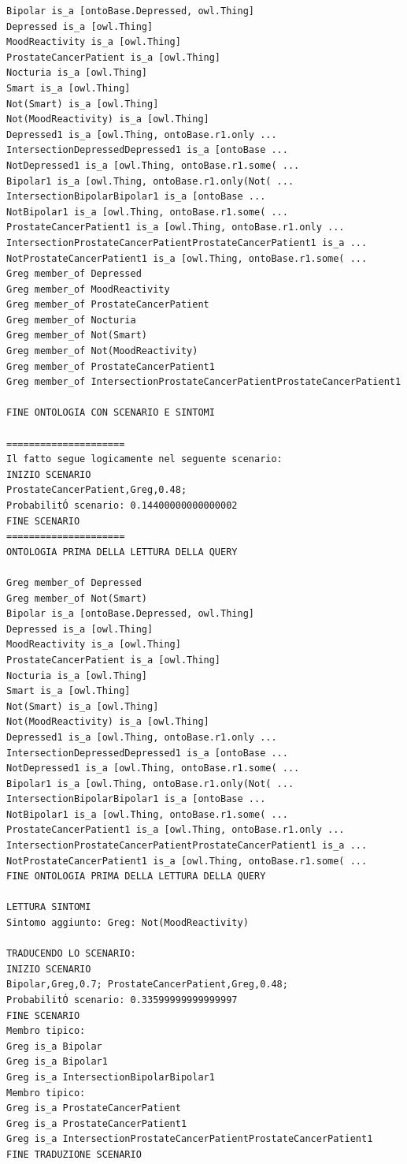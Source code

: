 \begin{verbatim}
Bipolar is_a [ontoBase.Depressed, owl.Thing]
Depressed is_a [owl.Thing]
MoodReactivity is_a [owl.Thing]
ProstateCancerPatient is_a [owl.Thing]
Nocturia is_a [owl.Thing]
Smart is_a [owl.Thing]
Not(Smart) is_a [owl.Thing]
Not(MoodReactivity) is_a [owl.Thing]
Depressed1 is_a [owl.Thing, ontoBase.r1.only ...
IntersectionDepressedDepressed1 is_a [ontoBase ...
NotDepressed1 is_a [owl.Thing, ontoBase.r1.some( ...
Bipolar1 is_a [owl.Thing, ontoBase.r1.only(Not( ...
IntersectionBipolarBipolar1 is_a [ontoBase ...
NotBipolar1 is_a [owl.Thing, ontoBase.r1.some( ...
ProstateCancerPatient1 is_a [owl.Thing, ontoBase.r1.only ...
IntersectionProstateCancerPatientProstateCancerPatient1 is_a ...
NotProstateCancerPatient1 is_a [owl.Thing, ontoBase.r1.some( ...
Greg member_of Depressed
Greg member_of MoodReactivity
Greg member_of ProstateCancerPatient
Greg member_of Nocturia
Greg member_of Not(Smart)
Greg member_of Not(MoodReactivity)
Greg member_of ProstateCancerPatient1
Greg member_of IntersectionProstateCancerPatientProstateCancerPatient1

FINE ONTOLOGIA CON SCENARIO E SINTOMI

=====================
Il fatto segue logicamente nel seguente scenario: 
INIZIO SCENARIO
ProstateCancerPatient,Greg,0.48; 
ProbabilitÓ scenario: 0.14400000000000002
FINE SCENARIO
=====================
ONTOLOGIA PRIMA DELLA LETTURA DELLA QUERY

Greg member_of Depressed
Greg member_of Not(Smart)
Bipolar is_a [ontoBase.Depressed, owl.Thing]
Depressed is_a [owl.Thing]
MoodReactivity is_a [owl.Thing]
ProstateCancerPatient is_a [owl.Thing]
Nocturia is_a [owl.Thing]
Smart is_a [owl.Thing]
Not(Smart) is_a [owl.Thing]
Not(MoodReactivity) is_a [owl.Thing]
Depressed1 is_a [owl.Thing, ontoBase.r1.only ...
IntersectionDepressedDepressed1 is_a [ontoBase ...
NotDepressed1 is_a [owl.Thing, ontoBase.r1.some( ...
Bipolar1 is_a [owl.Thing, ontoBase.r1.only(Not( ...
IntersectionBipolarBipolar1 is_a [ontoBase ...
NotBipolar1 is_a [owl.Thing, ontoBase.r1.some( ...
ProstateCancerPatient1 is_a [owl.Thing, ontoBase.r1.only ...
IntersectionProstateCancerPatientProstateCancerPatient1 is_a ...
NotProstateCancerPatient1 is_a [owl.Thing, ontoBase.r1.some( ...
FINE ONTOLOGIA PRIMA DELLA LETTURA DELLA QUERY

LETTURA SINTOMI
Sintomo aggiunto: Greg: Not(MoodReactivity)

TRADUCENDO LO SCENARIO: 
INIZIO SCENARIO
Bipolar,Greg,0.7; ProstateCancerPatient,Greg,0.48; 
ProbabilitÓ scenario: 0.33599999999999997
FINE SCENARIO
Membro tipico:
Greg is_a Bipolar
Greg is_a Bipolar1
Greg is_a IntersectionBipolarBipolar1
Membro tipico:
Greg is_a ProstateCancerPatient
Greg is_a ProstateCancerPatient1
Greg is_a IntersectionProstateCancerPatientProstateCancerPatient1
FINE TRADUZIONE SCENARIO


\end{verbatim}
